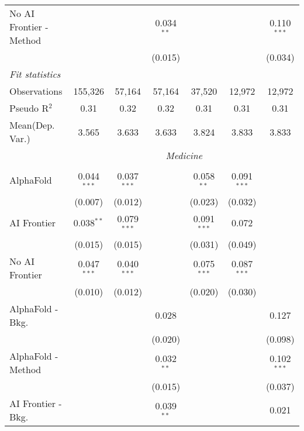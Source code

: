 \begin{tabular}{lcccccc}
   No AI Frontier - Method &               &               & 0.034$^{**}$ &               &               & 0.110$^{***}$\\   
                           &               &               & (0.015)      &               &               & (0.034)\\   
   \midrule
   \emph{Fit statistics}\\
   Observations            & 155,326       & 57,164        & 57,164       & 37,520        & 12,972        & 12,972\\  
   Pseudo R$^2$            & 0.31          & 0.32          & 0.32         & 0.31          & 0.31          & 0.31\\  
   
Mean(Dep. Var.) & 3.565 & 3.633 & 3.633 & 3.824 & 3.833 & 3.833 \\
 & \multicolumn{6}{c}{\textit{Medicine}} \\ \\
   AlphaFold               & 0.044$^{***}$ & 0.037$^{***}$ &               & 0.058$^{**}$  & 0.091$^{***}$ &   \\   
                           & (0.007)       & (0.012)       &               & (0.023)       & (0.032)       &   \\   
   AI Frontier             & 0.038$^{**}$  & 0.079$^{***}$ &               & 0.091$^{***}$ & 0.072         &   \\   
                           & (0.015)       & (0.015)       &               & (0.031)       & (0.049)       &   \\   
   No AI Frontier          & 0.047$^{***}$ & 0.040$^{***}$ &               & 0.075$^{***}$ & 0.087$^{***}$ &   \\   
                           & (0.010)       & (0.012)       &               & (0.020)       & (0.030)       &   \\   
   AlphaFold - Bkg.        &               &               & 0.028         &               &               & 0.127\\   
                           &               &               & (0.020)       &               &               & (0.098)\\   
   AlphaFold - Method      &               &               & 0.032$^{**}$  &               &               & 0.102$^{***}$\\   
                           &               &               & (0.015)       &               &               & (0.037)\\   
   AI Frontier - Bkg.      &               &               & 0.039$^{**}$  &               &               & 0.021\\   

\end{tabular}
